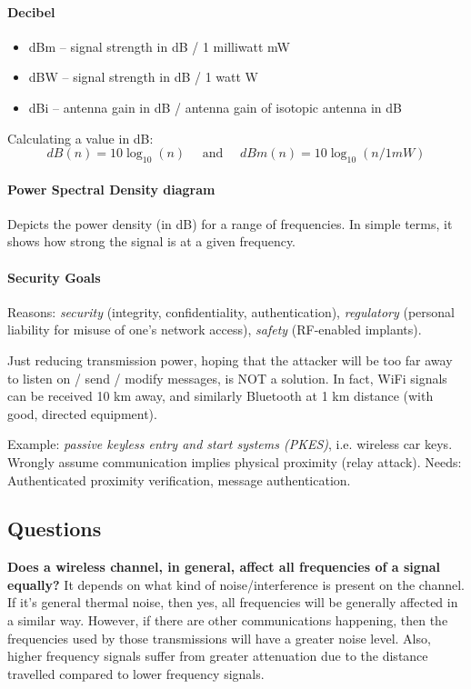 \paragraph{Decibel}
\begin{itemize}
	\item dBm -- signal strength in dB / 1 milliwatt mW
	\item dBW -- signal strength in dB / 1 watt W
	\item dBi -- antenna gain in dB / antenna gain of isotopic antenna in dB
\end{itemize}
Calculating a value in dB:
$$ dB(n) = 10 \log_{10} (n) \quad \text{ and } \quad dBm(n) = 10 \log_{10} (n / 1 mW) $$

\paragraph{Power Spectral Density diagram}
Depicts the power density (in dB) for a range of frequencies.
In simple terms, it shows how strong the signal is at a given frequency.


\paragraph{Security Goals}
Reasons: \textit{security} (integrity, confidentiality, authentication), \textit{regulatory} (personal liability for misuse of one's network access), \textit{safety} (RF-enabled implants).

Just reducing transmission power, hoping that the attacker will be too far away to listen on / send / modify messages, is NOT a solution.
In fact, WiFi signals can be received 10 km away, and similarly Bluetooth at 1 km distance (with good, directed equipment).

Example: \textit{passive keyless entry and start systems (PKES)}, i.e. wireless car keys.
Wrongly assume communication implies physical proximity (relay attack).
Needs: Authenticated proximity verification, message authentication.

\subsection{Questions}
\textbf{Does a wireless channel, in general, affect all frequencies of a signal equally?} It depends on what kind of noise/interference is present on the channel. If it's general thermal noise, then yes, all frequencies will be generally affected in a similar way. However, if there are other communications happening, then the frequencies used by those transmissions will have a greater noise level.
Also, higher frequency signals suffer from greater attenuation due to the distance travelled compared to lower frequency signals.

